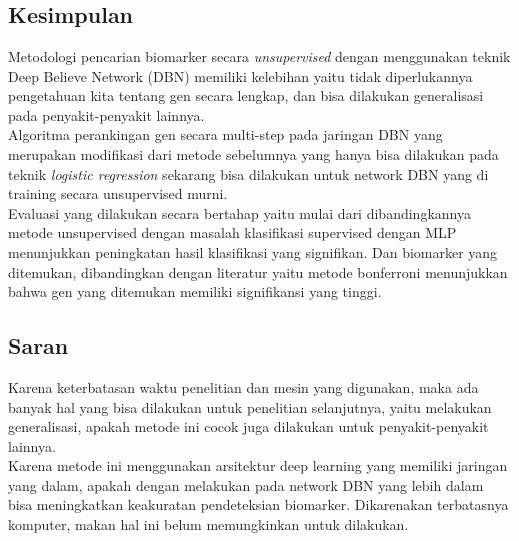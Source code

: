 \chapter{\kesimpulan}
	

\section{Kesimpulan}
Metodologi pencarian biomarker secara \textit{unsupervised} dengan menggunakan teknik Deep Believe Network (DBN) memiliki kelebihan yaitu tidak diperlukannya pengetahuan kita tentang gen secara lengkap, dan bisa dilakukan generalisasi pada penyakit-penyakit lainnya.\\
Algoritma perankingan gen secara multi-step pada jaringan DBN yang merupakan modifikasi dari metode sebelumnya yang hanya bisa dilakukan pada teknik \textit{logistic regression} sekarang bisa dilakukan untuk network DBN yang di training secara unsupervised murni.\\
Evaluasi yang dilakukan secara bertahap yaitu mulai dari dibandingkannya metode unsupervised dengan masalah klasifikasi supervised dengan MLP menunjukkan peningkatan hasil klasifikasi yang signifikan. Dan biomarker yang ditemukan, dibandingkan dengan literatur yaitu metode bonferroni menunjukkan bahwa gen yang ditemukan memiliki signifikansi yang tinggi.



\section{Saran}

Karena keterbatasan waktu penelitian dan mesin yang digunakan, maka ada banyak hal yang bisa dilakukan untuk penelitian selanjutnya, yaitu melakukan generalisasi, apakah metode ini cocok juga dilakukan untuk penyakit-penyakit lainnya. \\
Karena metode ini menggunakan arsitektur deep learning yang memiliki jaringan yang dalam, apakah dengan melakukan pada network DBN yang lebih dalam bisa meningkatkan keakuratan pendeteksian biomarker. Dikarenakan terbatasnya komputer, makan hal ini belum memungkinkan untuk dilakukan.
